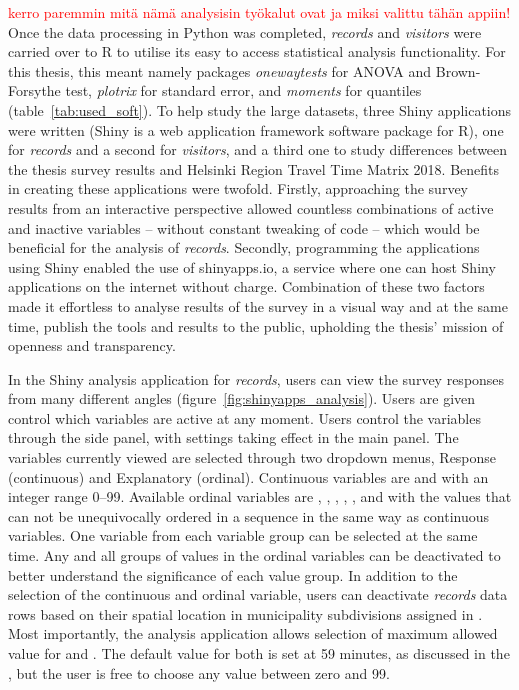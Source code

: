 \textcolor{red}{kerro paremmin mitä nämä analysisin työkalut ovat ja miksi valittu tähän appiin!}
Once the data processing in Python was completed, \textit{records} and \textit{visitors} were carried over to R to utilise its easy to access statistical analysis functionality. For this thesis, this meant namely packages \textit{onewaytests} for ANOVA and Brown-Forsythe test, \textit{plotrix} for standard error, and \textit{moments} for quantiles (table~\ref{tab:used_soft}). To help study the large datasets, three Shiny applications were written (Shiny is a web application framework software package for R), one for \textit{records} and a second for \textit{visitors}, and a third one to study differences between the thesis survey results and Helsinki Region Travel Time Matrix 2018. Benefits in creating these applications were twofold. Firstly, approaching the survey results from an interactive perspective allowed countless combinations of active and inactive variables -- without constant tweaking of code -- which would be beneficial for the analysis of \textit{records}. Secondly, programming the applications using Shiny enabled the use of shinyapps.io, a service where one can host Shiny applications on the internet without charge. Combination of these two factors made it effortless to analyse results of the survey in a visual way and at the same time, publish the tools and results to the public, upholding the thesis' mission of openness and transparency.

In the Shiny analysis application for \textit{records}, users can view the survey responses from many different angles (figure~\ref{fig:shinyapps_analysis}). Users are given control which variables are active at any moment. Users control the variables through the side panel, with settings taking effect in the main panel. The variables currently viewed are selected through two dropdown menus, Response (continuous) and Explanatory (ordinal). Continuous variables are  and  with an integer range 0--99. Available ordinal variables are , , , , , and  with the values that can not be unequivocally ordered in a sequence in the same way as continuous variables. One variable from each variable group can be selected at the same time. Any and all groups of values in the ordinal variables can be deactivated to better understand the significance of each value group. In addition to the selection of the continuous and ordinal variable, users can deactivate \textit{records} data rows based on their spatial location in municipality subdivisions assigned in \hyperref[sec:c3-processdata]{}. Most importantly, the analysis application allows selection of maximum allowed value for  and . The default value for both is set at 59 minutes, as discussed in the , but the user is free to choose any value between zero and 99.

